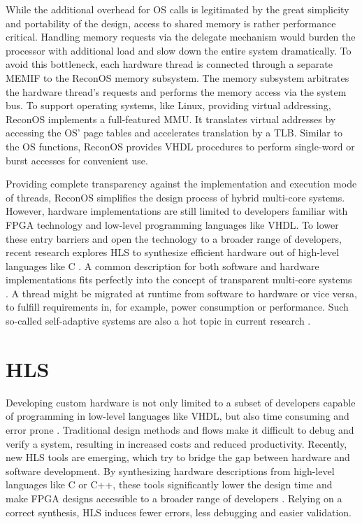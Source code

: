 While the additional overhead for \ac{OS} calls is legitimated by the great
simplicity and portability of the design, access to shared memory is rather
performance critical. Handling memory requests via the delegate mechanism
would burden the processor with additional load and slow down the entire
system dramatically. To avoid this bottleneck, each hardware thread is
connected through a separate \ac{MEMIF} to the ReconOS memory subsystem. The
memory subsystem arbitrates the hardware thread's requests and performs the
memory access via the system bus. To support operating systems, like Linux,
providing virtual addressing, ReconOS implements a full-featured \ac{MMU}. It
translates virtual addresses by accessing the \ac{OS}' page tables and
accelerates translation by a \ac{TLB}. Similar to the \ac{OS} functions,
ReconOS provides \ac{VHDL} procedures to perform single-word or burst accesses
for convenient use.

Providing complete transparency against the implementation and execution mode
of threads, ReconOS simplifies the design process of hybrid multi-core
systems. However, hardware implementations are still limited to developers
familiar with \ac{FPGA} technology and low-level programming languages like
\ac{VHDL}. To lower these entry barriers and open the technology to a broader
range of developers, recent research explores \ac{HLS} to synthesize efficient
hardware out of high-level languages like C \citep{SWL13}. A common
description for both software and hardware implementations fits perfectly into
the concept of transparent multi-core systems \citep{CBN11}. A thread might be
migrated at runtime from software to hardware or vice versa, to fulfill
requirements in, for example, power consumption or performance. Such so-called
self-adaptive systems are also a hot topic in current research
\citep{AHL14,HLP09}.

\section{\acl{HLS}}
Developing custom hardware is not only limited to a subset of developers
capable of programming in low-level languages like \ac{VHDL}, but also time
consuming and error prone \citep{SWL13}. Traditional design methods and flows
make it difficult to debug and verify a system, resulting in increased costs
and reduced productivity. Recently, new \ac{HLS} tools are emerging, which try
to bridge the gap between hardware and software development. By synthesizing
hardware descriptions from high-level languages like C or C++, these tools
significantly lower the design time and make \ac{FPGA} designs accessible to a
broader range of developers \citep{PeTh05}. Relying on a correct synthesis,
\ac{HLS} induces fewer errors, less debugging and easier validation.

